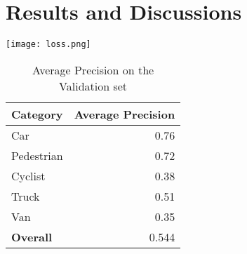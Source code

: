 \documentclass{article}
\begin{document}
\section{Results and Discussions}

\begin{table}[ht]
\begin{minipage}[b]{0.55\linewidth}
\centering
\texttt{[image: loss.png]}
\label{fig:image}
\end{minipage}
\begin{minipage}[b]{0.25\linewidth}
\centering
\begin{tabular}{ | l | r | }
    \hline
    Category & Average Precision \\ \hline \hline
    Car & 0.76\\ \hline
    Pedestrian & 0.72  \\ \hline
    Cyclist & 0.38\\ \hline
    Truck & 0.51\\ \hline
    Van & 0.35\\ \hline
    \textbf{Overall} & 0.544 \\ \hline
   \end{tabular}
    \caption{Average Precision on the Validation set}
    \label{table:student}
\end{minipage}\hfill
\end{table}
\end{document}
